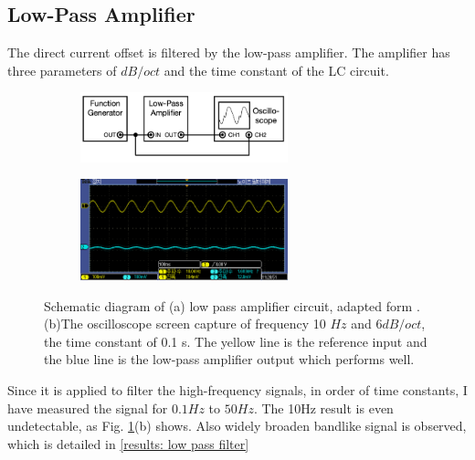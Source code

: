 \documentclass{article}
\begin{document}
\subsection{Low-Pass Amplifier}
 The direct current offset is filtered by the low-pass amplifier.
 The amplifier has three parameters of $dB/oct$ and the time constant of the LC circuit.

 \begin{figure}[ht]
    \centering
    \begin{subfigure}[b]{6cm}
        \centering
        \includegraphics[width=6cm]{../results/low_pass_amplifier_circuit.png}
        \caption{}
    \end{subfigure}
    \hfill
    \begin{subfigure}[b]{6cm}
        \centering
        \includegraphics[width=6cm]{../raw_data/TEK00453.PNG}
        \caption{}
    \end{subfigure}
    \hfill
    \caption{Schematic diagram of (a) low pass amplifier circuit, adapted form  \cite{signal_processor}.
    (b)The oscilloscope screen capture of frequency 10 $Hz$ and $6 dB/oct$, the time constant of 0.1 s.
    The yellow line is the reference input and the blue line is the low-pass amplifier output which performs well.
    }
    \label{fig: low_pass_amplifier_circuit}
  \end{figure}

 Since it is applied to filter the high-frequency signals, in order of time constants, I have measured the signal for $0.1Hz$ to $50Hz$.
 The 10Hz result is even undetectable, as Fig. \ref{fig: low_pass_amplifier_circuit}(b) shows.
 Also widely broaden bandlike signal is observed, which is detailed in \ref{results: low pass filter}
\end{document}
